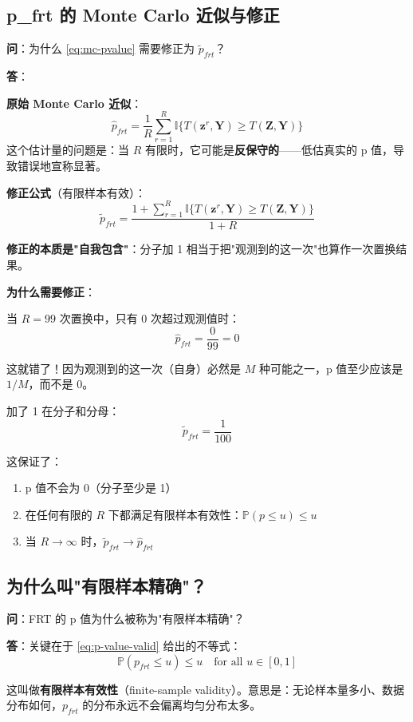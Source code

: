 \subsection{p\_frt 的 Monte Carlo 近似与修正}\label{sec:qa-pfrt-mc}

\textbf{问}：为什么 \cref{eq:mc-pvalue} 需要修正为 $\tilde p_{frt}$？

\textbf{答}：

\textbf{原始 Monte Carlo 近似}：
$$\hat{p}_{frt} = \frac{1}{R}\sum_{r=1}^R \mathbb{I}\{T(\mathbf{z}^r,\mathbf{Y}) \geq T(\mathbf{Z},\mathbf{Y})\}$$
这个估计量的问题是：当 $R$ 有限时，它可能是\textbf{反保守的}——低估真实的 p 值，导致错误地宣称显著。

\textbf{修正公式}（有限样本有效）：
$$\tilde{p}_{frt} = \frac{1 + \sum_{r=1}^R \mathbb{I}\{T(\mathbf{z}^r,\mathbf{Y}) \geq T(\mathbf{Z},\mathbf{Y})\}}{1+R}$$

\textbf{修正的本质是"自我包含"}：分子加 1 相当于把"观测到的这一次"也算作一次置换结果。

\textbf{为什么需要修正}：

当 $R=99$ 次置换中，只有 0 次超过观测值时：
$$\hat{p}_{frt} = \frac{0}{99} = 0$$

这就错了！因为观测到的这一次（自身）必然是 $M$ 种可能之一，p 值至少应该是 $1/M$，而不是 0。

加了 1 在分子和分母：
$$\tilde{p}_{frt} = \frac{1}{100}$$

这保证了：
\begin{enumerate}
  \item p 值不会为 0（分子至少是 1）
  \item 在任何有限的 $R$ 下都满足有限样本有效性：$\mathbb{P}(p \leq u) \leq u$
  \item 当 $R \to \infty$ 时，$\tilde p_{frt} \to \hat p_{frt}$
\end{enumerate}

\subsection{为什么叫"有限样本精确"？}\label{sec:qa-finite-sample-exact}

\textbf{问}：FRT 的 p 值为什么被称为"有限样本精确"？

\textbf{答}：关键在于 \cref{eq:p-value-valid} 给出的不等式：
$$\mathbb{P}(p_{frt} \leq u) \leq u \quad \text{for all } u \in [0,1]$$

这叫做\textbf{有限样本有效性}（finite-sample validity）。意思是：无论样本量多小、数据分布如何，$p_{frt}$ 的分布永远不会偏离均匀分布太多。

